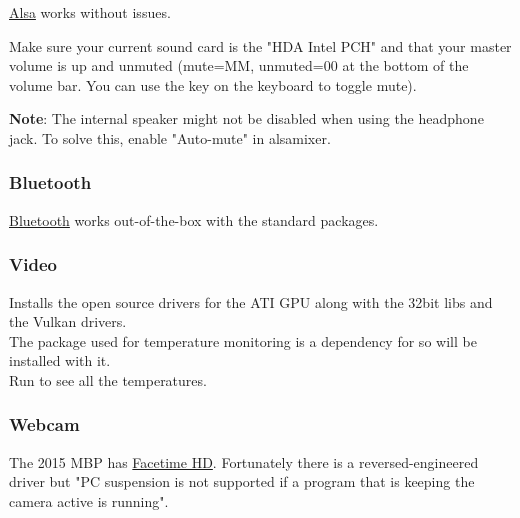 \href{https://wiki.archlinux.org/index.php/ALSA}{Alsa} works without issues.

\begin{blocksection}
    Make sure your current sound card is the "HDA Intel PCH" and that your master volume is up and unmuted (mute=MM, unmuted=00 at the bottom of the volume bar. You can use the  key on the keyboard to toggle mute).
\end{blocksection}


\textbf{Note}: The internal speaker might not be disabled when using the headphone jack. To solve this, enable "Auto-mute" in alsamixer.

\subsubsection{Bluetooth}

\href{https://wiki.archlinux.org/index.php/Bluetooth}{Bluetooth} works out-of-the-box with the standard packages.


\subsubsection{Video}

\begin{blocksection}
    Installs the open source drivers for the ATI GPU along with the 32bit libs and the Vulkan drivers.\\
    The \href{https://wiki.archlinux.org/index.php/Lm_sensors}{} package used for temperature monitoring is a dependency for  so will be installed with it.\\
    Run  to see all the temperatures.
\end{blocksection}

\subsubsection{Webcam}

The 2015 MBP has \href{https://wiki.archlinux.org/index.php/MacBook#Facetime_HD}{Facetime HD}.
Fortunately there is a reversed-engineered driver but "PC suspension is not supported if a 
program that is keeping the camera active is running".

